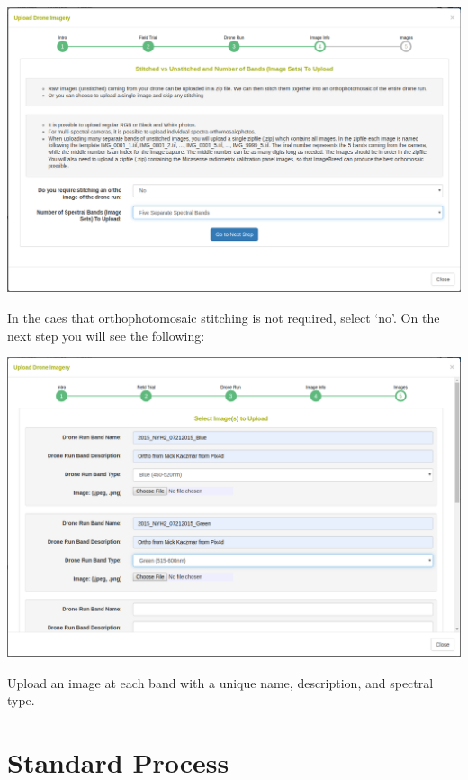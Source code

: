 \documentclass[
  12pt,
]{book}
\begin{document}
\begin{center}\includegraphics[width=0.95\linewidth]{assets/images/manage_image_phenotyping_upload_image_info_3} \end{center}

In the caes that orthophotomosaic stitching is not required, select `no'. On the next step you will see the following:

\begin{center}\includegraphics[width=0.95\linewidth]{assets/images/manage_image_phenotyping_upload_images_rasters} \end{center}

Upload an image at each band with a unique name, description, and spectral type.

\hypertarget{standard-process}{%
\section{Standard Process}\label{standard-process}}
\end{document}
